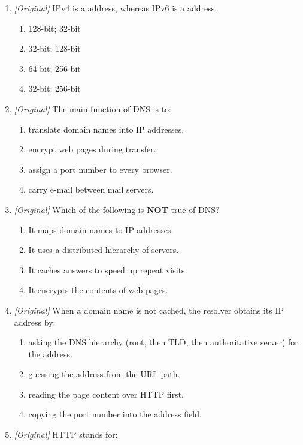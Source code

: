 \begin{enumerate}[label=\textbf{Q\arabic*.}, leftmargin=*]
\item \textit{[Original]} IPv4 is a \underline{\hspace{1.2cm}} address,
  whereas IPv6 is a \underline{\hspace{1.2cm}} address.
  \begin{enumerate}[label=\Alph*.]
    \item 128-bit; 32-bit
    \item 32-bit; 128-bit
    \item 64-bit; 256-bit
    \item 32-bit; 256-bit
  \end{enumerate}
\item \textit{[Original]} The main function of DNS is to:
  \begin{enumerate}[label=\Alph*.]
    \item translate domain names into IP addresses.
    \item encrypt web pages during transfer.
    \item assign a port number to every browser.
    \item carry e-mail between mail servers.
  \end{enumerate}
\item \textit{[Original]} Which of the following is \textbf{NOT} true of DNS?
  \begin{enumerate}[label=\Alph*.]
    \item It maps domain names to IP addresses.
    \item It uses a distributed hierarchy of servers.
    \item It caches answers to speed up repeat visits.
    \item It encrypts the contents of web pages.
  \end{enumerate}
\item \textit{[Original]} When a domain name is not cached, the resolver
  obtains its IP address by:
  \begin{enumerate}[label=\Alph*.]
    \item asking the DNS hierarchy (root, then TLD, then authoritative
      server) for the address.
    \item guessing the address from the URL path.
    \item reading the page content over HTTP first.
    \item copying the port number into the address field.
  \end{enumerate}
\item \textit{[Original]} HTTP stands for:

\end{enumerate}
